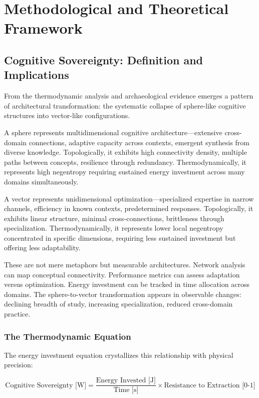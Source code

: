 \section{Methodological and Theoretical Framework}
\subsection{Cognitive Sovereignty: Definition and Implications}

From the thermodynamic analysis and archaeological evidence emerges a pattern of architectural transformation: the systematic collapse of sphere-like cognitive structures into vector-like configurations.

A sphere represents multidimensional cognitive architecture---extensive cross-domain connections, adaptive capacity across contexts, emergent synthesis from diverse knowledge. Topologically, it exhibits high connectivity density, multiple paths between concepts, resilience through redundancy. Thermodynamically, it represents high negentropy requiring sustained energy investment across many domains simultaneously.

A vector represents unidimensional optimization---specialized expertise in narrow channels, efficiency in known contexts, predetermined responses. Topologically, it exhibits linear structure, minimal cross-connections, brittleness through specialization. Thermodynamically, it represents lower local negentropy concentrated in specific dimensions, requiring less sustained investment but offering less adaptability.

These are not mere metaphors but measurable architectures. Network analysis can map conceptual connectivity. Performance metrics can assess adaptation versus optimization. Energy investment can be tracked in time allocation across domains. The sphere-to-vector transformation appears in observable changes: declining breadth of study, increasing specialization, reduced cross-domain practice.

\subsubsection{The Thermodynamic Equation}

The energy investment equation crystallizes this relationship with physical precision:

\begin{equation}
\text{Cognitive Sovereignty [W]} = \frac{\text{Energy Invested [J]}}{\text{Time [s]}} \times \text{Resistance to Extraction [0-1]}
\end{equation}

